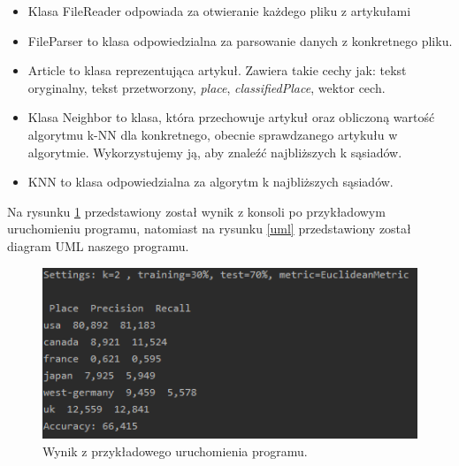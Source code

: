 \documentclass{classrep}
\begin{document}
\begin{itemize}
\item Klasa FileReader odpowiada za otwieranie każdego pliku z artykułami
\item FileParser to klasa odpowiedzialna za parsowanie danych z konkretnego pliku.
\item Article to klasa reprezentująca artykuł. Zawiera takie cechy jak: tekst oryginalny, tekst przetworzony, \textsl{place}, \textsl{classifiedPlace}, wektor cech.
\item Klasa Neighbor to klasa, która przechowuje artykuł oraz obliczoną wartość algorytmu k-NN dla konkretnego, obecnie sprawdzanego artykułu w algorytmie. Wykorzystujemy ją, aby znaleźć najbliższych k sąsiadów.
\item KNN to klasa odpowiedzialna za algorytm k najbliższych sąsiadów. 
\end{itemize}
Na rysunku \ref{exampleRun} przedstawiony został wynik z konsoli po przykładowym uruchomieniu programu, natomiast na rysunku \ref{uml} przedstawiony został diagram UML naszego programu. 

\begin{figure}[h!]
	\centering
	\includegraphics[width=1\textwidth]{exampleRun.png}
	\caption{Wynik z przykładowego uruchomienia programu.}
	\label{exampleRun}
\end{figure}
\end{document}
